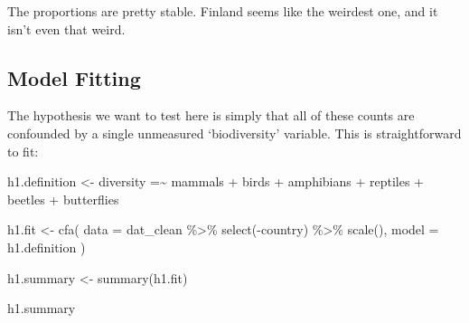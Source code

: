 \documentclass[
  letterpaper,
  DIV=11,
  numbers=noendperiod]{scrreprt}
\newenvironment{Shaded}{\begin{snugshade}}{\end{snugshade}}
\newcommand{\AttributeTok}[1]{\textcolor[rgb]{0.40,0.45,0.13}{#1}}
\newcommand{\FunctionTok}[1]{\textcolor[rgb]{0.28,0.35,0.67}{#1}}
\newcommand{\NormalTok}[1]{\textcolor[rgb]{0.00,0.23,0.31}{#1}}
\newcommand{\OtherTok}[1]{\textcolor[rgb]{0.00,0.23,0.31}{#1}}
\newcommand{\SpecialCharTok}[1]{\textcolor[rgb]{0.37,0.37,0.37}{#1}}
\newcommand{\StringTok}[1]{\textcolor[rgb]{0.13,0.47,0.30}{#1}}
\begin{document}
The proportions are pretty stable. Finland seems like the weirdest one,
and it isn't even that weird.

\hypertarget{model-fitting-1}{%
\subsection*{Model Fitting}\label{model-fitting-1}}

The hypothesis we want to test here is simply that all of these counts
are confounded by a single unmeasured `biodiversity' variable. This is
straightforward to fit:

\begin{Shaded}
\begin{Highlighting}[]
\NormalTok{h1.definition }\OtherTok{\textless{}{-}} 
\StringTok{\textquotesingle{}diversity =\textasciitilde{} mammals + birds + amphibians + reptiles + beetles + butterflies\textquotesingle{}}

\NormalTok{h1.fit }\OtherTok{\textless{}{-}} \FunctionTok{cfa}\NormalTok{(}
  \AttributeTok{data  =}\NormalTok{ dat\_clean }\SpecialCharTok{\%\textgreater{}\%} \FunctionTok{select}\NormalTok{(}\SpecialCharTok{{-}}\NormalTok{country) }\SpecialCharTok{\%\textgreater{}\%} \FunctionTok{scale}\NormalTok{(),}
  \AttributeTok{model =}\NormalTok{ h1.definition}
\NormalTok{)}

\NormalTok{h1.summary }\OtherTok{\textless{}{-}} \FunctionTok{summary}\NormalTok{(h1.fit)}

\NormalTok{h1.summary}
\end{Highlighting}
\end{Shaded}
\end{document}
